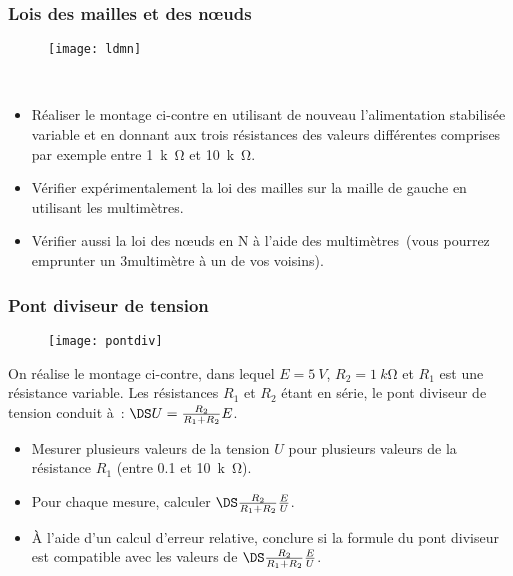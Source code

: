 \documentclass[a4paper, 11pt, final, garamond]{book}
\begin{document}
\subsubsection{Lois des mailles et des nœuds}
\begin{wrapfigure}[5]{R}{.4\linewidth}
    \centering
    \texttt{[image: ldmn]}
\end{wrapfigure}
~\vspace{-20pt}
\begin{itemize}
    \item Réaliser le montage ci-contre en utilisant de nouveau l’alimentation
        stabilisée variable et en donnant aux trois résistances des valeurs
        différentes comprises par exemple entre \SI{1}{k\ohm} et \SI{10}{k\ohm}.
    \item Vérifier expérimentalement la loi des mailles sur la maille de gauche
        en utilisant les multimètres.
    \item Vérifier aussi la loi des nœuds en N à l’aide des multimètres (vous
        pourrez emprunter un 3\ieme multimètre à un de vos voisins).
\end{itemize}

\subsubsection{Pont diviseur de tension}
\begin{wrapfigure}[5]{R}{.2\linewidth}
    \centering
    \texttt{[image: pontdiv]}
\end{wrapfigure}

On réalise le montage ci-contre, dans lequel $E = \SI{5}{V}$, $R_2 =
\SI{1}{k\ohm}$ et $R_1$ est une résistance variable. Les résistances $R_1$ et
$R_2$ étant en série, le pont diviseur de tension conduit à : $\DS U =
\frac{R_2}{R_1+R_2}E$.

\begin{itemize}
    \item Mesurer plusieurs valeurs de la tension $U$ pour plusieurs valeurs de
        la résistance $R_1$ (entre \num{0.1} et \SI{10}{k\ohm}).
    \item Pour chaque mesure, calculer $\DS \frac{R_2}{R_1+R_2} \frac{E}{U}$.
    \item À l’aide d’un calcul d’erreur relative, conclure si la formule du pont
        diviseur est compatible avec les valeurs de $\DS \frac{R_2}{R_1+R_2}
        \frac{E}{U}$.
\end{itemize}
\end{document}
